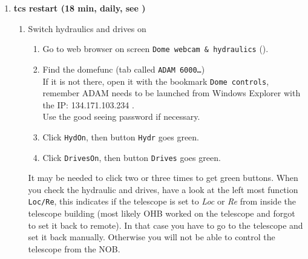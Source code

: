 \documentclass[11pt,fleqn,a4paper]{book}
\begin{document}
\begin{enumerate}
\begin{enumerate}
\begin{enumerate}
           \end{enumerate}
           \item Failure to set filter wheel to BB{\#}Rc: PRESS RESET in Auxiliary panel on the TCS computer
          \item Bonus feature: To check the status of the WFI Pulpo:
              \begin{enumerate}
         	    \item In a terminal (w2p2ins) : cd ~/bin 
         	    \item Run: CheckPulpo.sh , this will show you the status, e.g. temperatures, alarms (Enabled) of WFI . The Telemetry panel on the TCS will also show those values, but sometimes the TCS telemetry fails and  this command helps to keep track of the status of the instrument (see Figure ).
         	    \end{enumerate}  
        \end{enumerate}
\bigskip
\newpage
  \item \textbf{\gls{tcs} restart (18 min, daily, see )}
        \begin{enumerate}
        \item\label{lab:hydron} Switch hydraulics and drives on
             \begin{enumerate}
               \item Go to web browser on screen \texttt{Dome webcam \& hydraulics} (). 
               \item Find the \gls{domefunc} (tab called \texttt{ADAM 6000…})\\
                     If it is not there, open it with the bookmark \texttt{Dome controls}, remember ADAM needs to be launched from Windows Explorer with the IP: 134.171.103.234 .\\
                     Use the good seeing password if necessary.
               \item Click \texttt{HydOn}, then button \texttt{Hydr} goes green.
               \item Click \texttt{DrivesOn}, then button \texttt{Drives} goes green.
             \end{enumerate}
             It may be needed to click two or three times to get green buttons.  When you check the hydraulic and drives, have a look at the left most function \texttt{Loc/Re}, this indicates if the telescope is set to {\it{Loc}} or {\it{Re}} from inside the telescope building (most likely OHB worked on the telescope and forgot to set it back to remote). In that case you have to go to the telescope and set it back manually. Otherwise you will not be able to control the telescope from the NOB. 

\end{enumerate}
\end{enumerate}
\end{document}

